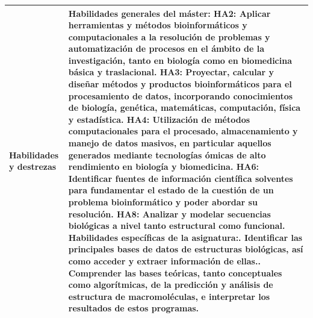 \documentclass[
  11pt,
  a4paper,
  twoside]{scrreprt}
\begin{document}
\begin{longtable}{p{} p{}}
\textbf{Habilidades y destrezas} &
\textbf{Habilidades generales del máster:}\newline
\textbf{HA2}: Aplicar herramientas y métodos bioinformáticos y computacionales a la resolución de problemas y automatización de procesos en el ámbito de la investigación, tanto en biología como en biomedicina básica y traslacional.\newline
\textbf{HA3}: Proyectar, calcular y diseñar métodos y productos bioinformáticos para el procesamiento de datos, incorporando conocimientos de biología, genética, matemáticas, computación, física y estadística.\newline
\textbf{HA4}: Utilización de métodos computacionales para el procesado, almacenamiento y manejo de datos masivos, en particular aquellos generados mediante tecnologías ómicas de alto rendimiento en biología y biomedicina.\newline
\textbf{HA6}: Identificar fuentes de información científica solventes para fundamentar el estado de la cuestión de un problema bioinformático y poder abordar su resolución.\newline
\textbf{HA8}: Analizar y modelar secuencias biológicas a nivel tanto estructural como funcional.\newline\newline
\textbf{Habilidades específicas de la asignatura:}\newline
1. Identificar las principales bases de datos de estructuras biológicas, así como acceder y extraer información de ellas.\newline
2. Comprender las bases teóricas, tanto conceptuales como algorítmicas, de la predicción y análisis de estructura de macromoléculas, e interpretar los resultados de estos programas. \\
\hline


\end{longtable}
\end{document}
